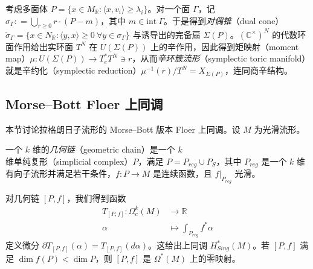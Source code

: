 考虑多面体 $P=\{x\in M_{\mathbb{R}}\colon\langle x,v_i\rangle\geq\lambda_i\}$。对一个面 $\Gamma$，记 $\sigma_{\Gamma}\colon =\displaystyle\bigcup_{r\geq 0} r\cdot (P -m)$，其中 $m\in\mathrm{int}\ \Gamma$。于是得到\emph{对偶锥}（dual cone）$\check{\sigma}_{\Gamma} =\{x\in N_{\mathbb{R}}\colon\langle y,x\rangle\geq 0\ \forall y\in\sigma_{\Gamma}\}$ 与诱导出的完备扇 $\Sigma (P)$。$\left(\mathbb{C}^{\times}\right)^N$ 的代数环面作用给出实环面 $T^N$ 在 $U(\Sigma (P))$ 上的辛作用，因此得到矩映射（moment map）$\mu\colon U(\Sigma (P))\to T_e^{\ast} T^N\ni r$，从而\emph{辛环簇流形}（symplectic toric manifold）就是辛约化（symplectic reduction）$\mu^{-1} (r)/T^N=X_{\Sigma(P)}$，连同商辛结构。


\subsection{Morse--Bott Floer 上同调}

本节讨论拉格朗日子流形的 Morse--Bott 版本 Floer 上同调。设 $M$ 为光滑流形。


\begin{definition*}
一个 $k$ 维的\emph{几何链}（geometric chain）是一个 $k$ 维单纯复形（simplicial complex）$P$，满足 $P=P_{reg}\cup P_S$，其中 $P_{reg}$ 是一个 $k$ 维有向子流形并满足若干条件，$f\colon P\to M$ 是连续函数，且 $f\vert_{P_{reg}}$ 光滑。
\end{definition*}

对几何链 $[P,f]$，我们得到函数
\begin{align*}
  T_{[P,f]}\colon\Omega_c^k (M)&\to \mathbb{R}\\
  \alpha&\mapsto \int_{P_{reg}} f^{\ast}\alpha
\end{align*}
定义微分 $\partial T_{[P,f]} (\alpha) =T_{[P,f]} (d\alpha)$。这给出上同调 $H_{Sing}^{\ast} (M)$。若 $[P,f]$ 满足 $\dim f(P)<\dim P$，则 $[P,f]$ 是 $\Omega^{\ast} (M)$ 上的零映射。


